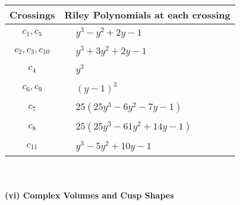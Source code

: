 \documentclass[1p]{elsarticle_modified}
\theoremstyle{definition}
\begin{document}
\begin{tabular}{m{50pt}|m{274pt}}
Crossings & \hspace{64pt}Riley Polynomials at each crossing \\
\hline $$\begin{aligned}c_{1},c_{5}\end{aligned}$$&$\begin{aligned}
&y^3- y^2+2 y-1
\end{aligned}$\\
\hline $$\begin{aligned}c_{2},c_{3},c_{10}\end{aligned}$$&$\begin{aligned}
&y^3+3 y^2+2 y-1
\end{aligned}$\\
\hline $$\begin{aligned}c_{4}\end{aligned}$$&$\begin{aligned}
&y^3
\end{aligned}$\\
\hline $$\begin{aligned}c_{6},c_{9}\end{aligned}$$&$\begin{aligned}
&(y-1)^3
\end{aligned}$\\
\hline $$\begin{aligned}c_{7}\end{aligned}$$&$\begin{aligned}
&25(25 y^3-6 y^2-7 y-1)
\end{aligned}$\\
\hline $$\begin{aligned}c_{8}\end{aligned}$$&$\begin{aligned}
&25(25 y^3-61 y^2+14 y-1)
\end{aligned}$\\
\hline $$\begin{aligned}c_{11}\end{aligned}$$&$\begin{aligned}
&y^3-5 y^2+10 y-1
\end{aligned}$\\
\hline
\end{tabular}\\~\\
\newpage\flushleft \textbf{(vi) Complex Volumes and Cusp Shapes}
\end{document}
